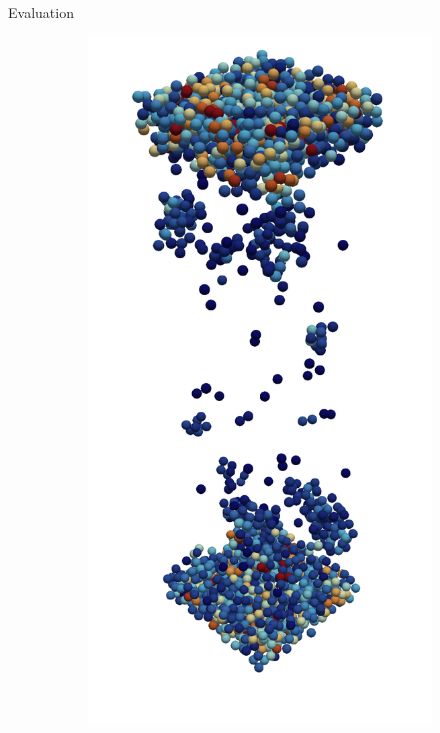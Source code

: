 \begin{frame}[c]{Evaluation}{}
{\begin{figure}[htpb]
\begin{subfigure}[c]{.2\textwidth}
			\vspace{-2cm}
		\end{subfigure}%
		\begin{subfigure}[c]{.2\textwidth}
			\centering
			\vspace{-1cm}
			\includegraphics[width=\textwidth]{exploding-liquid/render/t11000.png}

\end{subfigure}
\end{figure}}
\end{frame}
